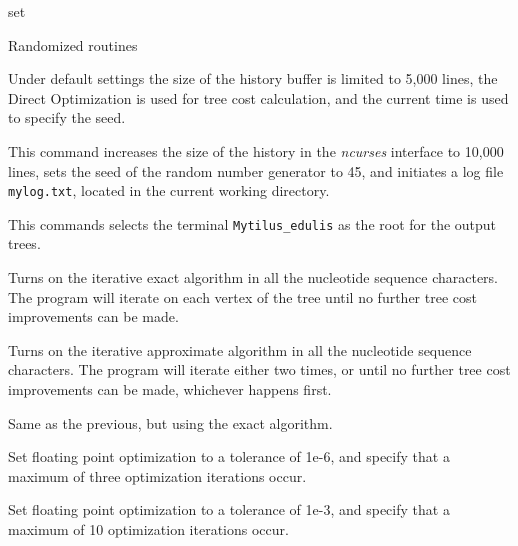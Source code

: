 \begin{command}{set}{}
\begin{arguments}
\begin{argumentgroup}{Randomized routines}
        \end{argumentgroup}
	\end{arguments}

        {Under default settings the size of the history buffer is limited to
        5,000 lines, the Direct Optimization is used for tree cost calculation,
        and the current time is used to specify the seed.}

    \begin{poyexamples}
            {This command increases the size of the history in the \emph{ncurses}
            interface to 10,000 lines, sets the seed of the random number generator to 45,
            and initiates a log file \texttt{mylog.txt}, located in the current
            working directory.}
            
            {This commands selects the terminal \texttt{Mytilus\_edulis} as the root
            for the output trees.}
            
            {Turns on the iterative exact algorithm in all the nucleotide
            sequence characters. The program will iterate on each vertex of the
            tree until no further tree cost improvements can be made.}

            {Turns on the iterative approximate algorithm in all the nucleotide
            sequence characters. The program will iterate either two times, or
            until no further tree cost improvements can be made, whichever
            happens first.}

            {Same as the previous, but using the exact algorithm.}
            
            {Set floating point optimization to a tolerance of 1e-6, and specify that
            a maximum of three optimization iterations occur.}
            
            {Set floating point optimization to a tolerance of 1e-3, and specify that
            a maximum of 10 optimization iterations occur.}

     \end{poyexamples}
     
	\begin{poyalso}
	\end{poyalso}

\end{command}

